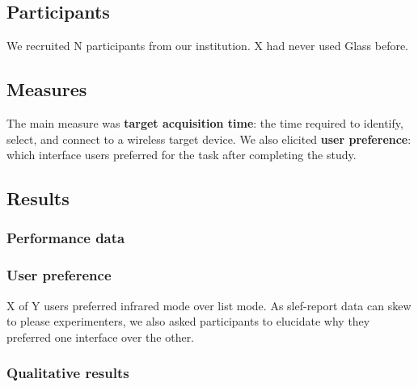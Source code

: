 \subsection{Participants}
We recruited N participants from our institution. X had never used Glass before.

\subsection{Measures}
The main measure was {\bf target acquisition time}: the time required to identify, select, and connect to a wireless target device. We also elicited {\bf user preference}: which interface users preferred for the task after completing the study.

\subsection{Results}

\subsubsection{Performance data}

\subsubsection{User preference}
X of Y users preferred infrared mode over list mode. As slef-report data can skew to please experimenters, we also asked participants to elucidate why they preferred one interface over the other.


\subsubsection{Qualitative results}

